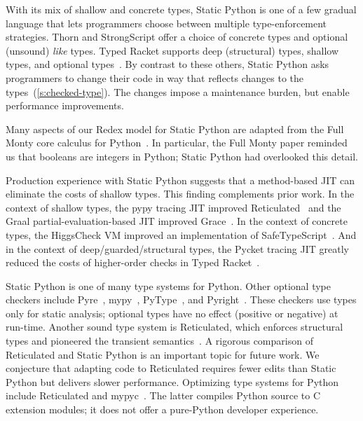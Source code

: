 \documentclass[english,cleveref,submission]{programming}
\newcommand{\SP}{Static Python}
\begin{document}
With its mix of shallow and concrete types, \SP{} is one of a few gradual
language that lets programmers choose between multiple type-enforcement strategies.
Thorn and StrongScript offer a choice of concrete types and optional (unsound)
\emph{like} types.
Typed Racket supports deep (structural) types, shallow types, and optional
types~\cite{g-pldi-2022}.
By contrast to these others, \SP{} asks programmers to change their code
in way that reflects changes to the types~(\cref{s:checked-type}).
The changes impose a maintenance burden, but enable performance improvements.

Many aspects of our Redex model for \SP{} are adapted from the Full Monty core calculus
for Python~\cite{pmmwplck-oopsla-2013}.
In particular, the Full Monty paper reminded us that booleans are integers in Python;
\SP{} had overlooked this detail.

Production experience with \SP{} suggests that a method-based JIT can
eliminate the costs of shallow types.
This finding complements prior work.
In the context of shallow types,
the pypy tracing JIT improved Reticulated~\cite{vsc-dls-2019}
and the Graal partial-evaluation-based JIT improved Grace~\cite{rmhn-ecoop-2019,grmhn-vmil-2019}.
In the context of concrete types, the HiggsCheck VM improved an implementation of
SafeTypeScript~\cite{rsfbv-popl-2015,rat-oopsla-2017}.
And in the context of deep/guarded/structural types, the Pycket tracing JIT greatly reduced the costs of higher-order
checks in Typed Racket~\cite{bbst-oopsla-2017}.

\SP{} is one of many type systems for Python.
Other optional type checkers include Pyre~\cite{pyre},
mypy~\cite{mypy}, PyType~\cite{pytype}, and Pyright~\cite{pyright}.
These checkers use types only for static analysis; optional types have no
effect (positive or negative) at run-time.
Another sound type system is Reticulated, which enforces structural types and
pioneered the transient semantics~\cite{vss-popl-2017,v-thesis-2019}.
A rigorous comparison of Reticulated and \SP{} is an important topic for future work.
We conjecture that adapting code to Reticulated requires fewer edits than \SP{}
but delivers slower performance.
Optimizing type systems for Python include Reticulated and mypyc~\cite{mypyc}.
The latter compiles Python source to C extension modules;
it does not offer a pure-Python developer experience.
\end{document}

